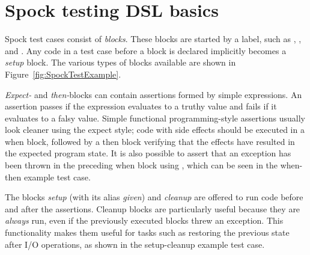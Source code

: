 \section{Spock testing DSL basics}
Spock test cases consist of \textit{blocks}.
These blocks are started by a label,
such as , , and .
Any code in a test case before a block is declared
implicitly becomes a \textit{setup} block.
\autocite[Chapter: Spock Primer - Feature Methods - Blocks]{SpockFrameworkDoc}
The various types of blocks available
are shown in Figure~\ref{fig:SpockTestExample}.

\textit{Expect-} and \textit{then-}blocks
can contain assertions formed by simple expressions.
An assertion passes if the expression evaluates to a truthy value
and fails if it evaluates to a falsy value.
Simple functional programming-style assertions
usually look cleaner using the expect style;
code with side effects should be executed in a when block,
followed by a then block verifying that
the effects have resulted in the expected program state.
It is also possible to assert that an exception
has been thrown in the preceding when block using ,
which can be seen in the when-then example test case.

The blocks \textit{setup} (with its alias \textit{given}) and \textit{cleanup}
are offered to run code before and after the assertions.
Cleanup blocks are particularly useful because they are \textit{always} run,
even if the previously executed blocks threw an exception.
\autocite[Chapter: Spock Primer - Feature Methods - Blocks]{SpockFrameworkDoc}
This functionality makes them useful for tasks
such as restoring the previous state after I/O operations,
as shown in the setup-cleanup example test case.
